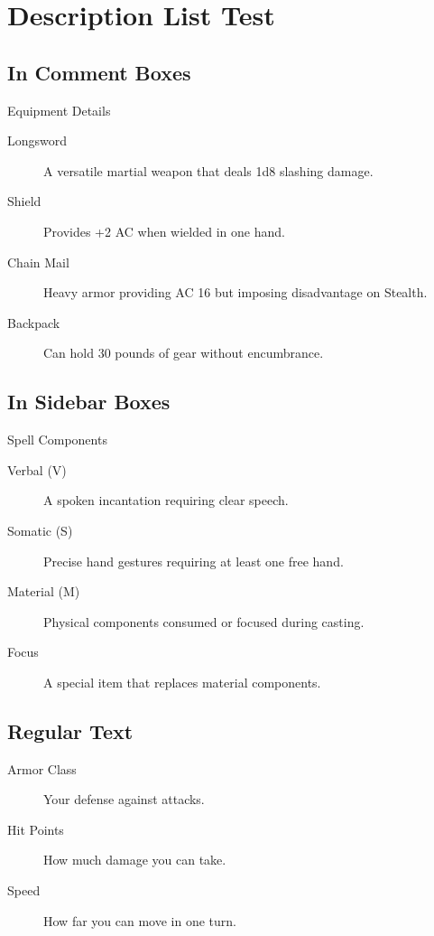 \documentclass[letterpaper,twocolumn]{dndbook}
\begin{document}
\chapter{Description List Test}

\section{In Comment Boxes}

\begin{DndComment}{Equipment Details}
  \begin{description}
    \item[Longsword] A versatile martial weapon that deals 1d8 slashing damage.
    \item[Shield] Provides +2 AC when wielded in one hand.
    \item[Chain Mail] Heavy armor providing AC 16 but imposing disadvantage on Stealth.
    \item[Backpack] Can hold 30 pounds of gear without encumbrance.
  \end{description}
\end{DndComment}

\section{In Sidebar Boxes}

\begin{DndSidebar}{Spell Components}
  \begin{description}
    \item[Verbal (V)] A spoken incantation requiring clear speech.
    \item[Somatic (S)] Precise hand gestures requiring at least one free hand.
    \item[Material (M)] Physical components consumed or focused during casting.
    \item[Focus] A special item that replaces material components.
  \end{description}
\end{DndSidebar}

\section{Regular Text}

\begin{description}
  \item[Armor Class] Your defense against attacks.
  \item[Hit Points] How much damage you can take.
  \item[Speed] How far you can move in one turn.
\end{description}
\end{document}
